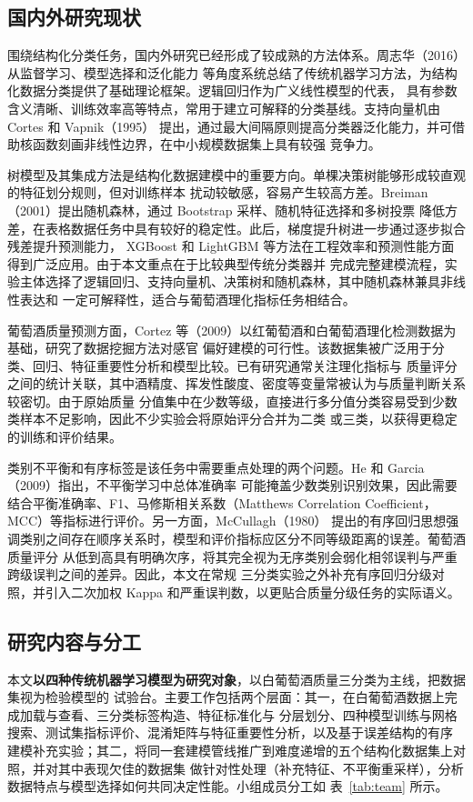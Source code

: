 \documentclass[12pt,a4paper,fontset=fandol]{ctexart}
\numberwithin{figure}{section}
\numberwithin{table}{section}
\numberwithin{equation}{section}
\begin{document}
\subsection{国内外研究现状}
围绕结构化分类任务，国内外研究已经形成了较成熟的方法体系。周志华（2016）从监督学习、模型选择和泛化能力
等角度系统总结了传统机器学习方法，为结构化数据分类提供了基础理论框架。逻辑回归作为广义线性模型的代表，
具有参数含义清晰、训练效率高等特点，常用于建立可解释的分类基线。支持向量机由 Cortes 和 Vapnik（1995）
提出，通过最大间隔原则提高分类器泛化能力，并可借助核函数刻画非线性边界，在中小规模数据集上具有较强
竞争力。

树模型及其集成方法是结构化数据建模中的重要方向。单棵决策树能够形成较直观的特征划分规则，但对训练样本
扰动较敏感，容易产生较高方差。Breiman（2001）提出随机森林，通过 Bootstrap 采样、随机特征选择和多树投票
降低方差，在表格数据任务中具有较好的稳定性。此后，梯度提升树进一步通过逐步拟合残差提升预测能力，
XGBoost 和 LightGBM 等方法在工程效率和预测性能方面得到广泛应用。由于本文重点在于比较典型传统分类器并
完成完整建模流程，实验主体选择了逻辑回归、支持向量机、决策树和随机森林，其中随机森林兼具非线性表达和
一定可解释性，适合与葡萄酒理化指标任务相结合。

葡萄酒质量预测方面，Cortez 等（2009）以红葡萄酒和白葡萄酒理化检测数据为基础，研究了数据挖掘方法对感官
偏好建模的可行性。该数据集被广泛用于分类、回归、特征重要性分析和模型比较。已有研究通常关注理化指标与
质量评分之间的统计关联，其中酒精度、挥发性酸度、密度等变量常被认为与质量判断关系较密切。由于原始质量
分值集中在少数等级，直接进行多分值分类容易受到少数类样本不足影响，因此不少实验会将原始评分合并为二类
或三类，以获得更稳定的训练和评价结果。

类别不平衡和有序标签是该任务中需要重点处理的两个问题。He 和 Garcia（2009）指出，不平衡学习中总体准确率
可能掩盖少数类别识别效果，因此需要结合平衡准确率、F1、马修斯相关系数（Matthews Correlation Coefficient，MCC）等指标进行评价。另一方面，McCullagh（1980）
提出的有序回归思想强调类别之间存在顺序关系时，模型和评价指标应区分不同等级距离的误差。葡萄酒质量评分
从低到高具有明确次序，将其完全视为无序类别会弱化相邻误判与严重跨级误判之间的差异。因此，本文在常规
三分类实验之外补充有序回归分级对照，并引入二次加权 Kappa 和严重误判数，以更贴合质量分级任务的实际语义。

\subsection{研究内容与分工}
本文\textbf{以四种传统机器学习模型为研究对象}，以白葡萄酒质量三分类为主线，把数据集视为检验模型的
试验台。主要工作包括两个层面：其一，在白葡萄酒数据上完成加载与查看、三分类标签构造、特征标准化与
分层划分、四种模型训练与网格搜索、测试集指标评价、混淆矩阵与特征重要性分析，以及基于误差结构的有序
建模补充实验；其二，将同一套建模管线推广到难度递增的五个结构化数据集上对照，并对其中表现欠佳的数据集
做针对性处理（补充特征、不平衡重采样），分析数据特点与模型选择如何共同决定性能。小组成员分工如
表~\ref{tab:team} 所示。
\end{document}
